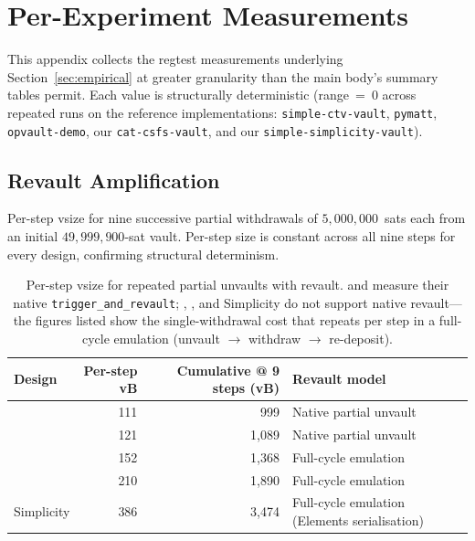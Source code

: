 
\section{Per-Experiment Measurements}
\label{app:measurements}

This appendix collects the regtest measurements underlying
Section~\ref{sec:empirical} at greater granularity than the main
body's summary tables permit. Each value is structurally
deterministic (range~=~0 across repeated runs on the reference
implementations: \texttt{simple-ctv-vault}, \texttt{pymatt},
\texttt{opvault-demo}, our \texttt{cat-csfs-vault}, and our
\texttt{simple-simplicity-vault}).

\subsection{Revault Amplification}
\label{app:meas:revault}

Per-step vsize for nine successive partial withdrawals of
$5{,}000{,}000$~sats each from an initial $49{,}999{,}900$-sat
vault. Per-step size is constant across all nine steps for every
design, confirming structural determinism.

\begin{table}[h]
\centering
\caption{Per-step vsize for repeated partial unvaults with
revault. \opccv{} and \opvault{} measure their native
\texttt{trigger\_and\_revault}; \opctv{}, \catcsfs{}, and Simplicity do
not support native revault---the figures listed show the
single-withdrawal cost that repeats per step in a full-cycle
emulation (unvault $\rightarrow$ withdraw $\rightarrow$
re-deposit).}
\label{tab:revault_appendix}
\small
\begin{tabular}{@{}lrrl@{}}
\toprule
Design   & Per-step vB & Cumulative @ 9 steps (vB) & Revault model \\
\midrule
\opccv{}       & 111 & 999    & Native partial unvault \\
\opvault{} & 121 & 1{,}089 & Native partial unvault \\
\opctv{}       & 152 & 1{,}368 & Full-cycle emulation \\
\catcsfs{}  & 210 & 1{,}890 & Full-cycle emulation \\
Simplicity & 386 & 3{,}474 & Full-cycle emulation (Elements serialisation) \\
\bottomrule
\end{tabular}
\end{table}

